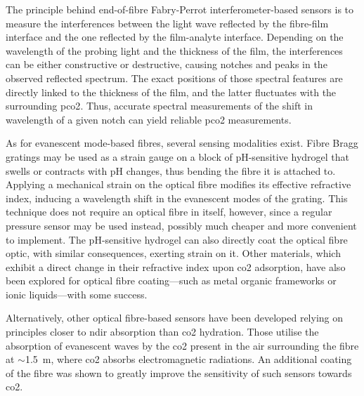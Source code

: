 The principle behind end-of-fibre Fabry-Perrot interferometer-based sensors is to measure the interferences between the light wave reflected by the fibre-film interface and the one reflected by the film-analyte interface. Depending on the wavelength of the probing light and the thickness of the film, the interferences can be either constructive or destructive, causing notches and peaks in the observed reflected spectrum. The exact positions of those spectral features are directly linked to the thickness of the film, and the latter fluctuates with the surrounding \gls{pco2}. Thus, accurate spectral measurements of the shift in wavelength of a given notch can yield reliable \gls{pco2} measurements\cite{zheng2015, ma2018}.

As for evanescent mode-based fibres, several sensing modalities exist. Fibre Bragg gratings may be used as a strain gauge on a block of pH-sensitive hydrogel that swells or contracts with pH changes, thus bending the fibre it is attached to\cite{quintero2010}. Applying a mechanical strain on the optical fibre modifies its effective refractive index\cite{hill1997}, inducing a wavelength shift in the evanescent modes of the grating. This technique does not require an optical fibre in itself, however, since a regular pressure sensor may be used instead, possibly much cheaper and more convenient to implement\cite{herber2004}. The pH-sensitive hydrogel can also directly coat the optical fibre optic, with similar consequences, exerting strain on it\cite{hu2015}. Other materials, which exhibit a direct change in their refractive index upon \gls{co2} adsorption, have also been explored for optical fibre coating---such as metal organic frameworks or ionic liquids---with some success\cite{hromadka2018, barrington2018}.

Alternatively, other optical fibre-based sensors have been developed relying on principles closer to \gls{ndir} absorption than \gls{co2} hydration. Those utilise the absorption of evanescent waves by the \gls{co2} present in the air surrounding the fibre at $\sim$1.5~\textmu{}m, where \gls{co2} absorbs electromagnetic radiations. An additional coating of the fibre was shown to greatly improve the sensitivity of such sensors towards \gls{co2}\cite{melo2014, chong2015}.


